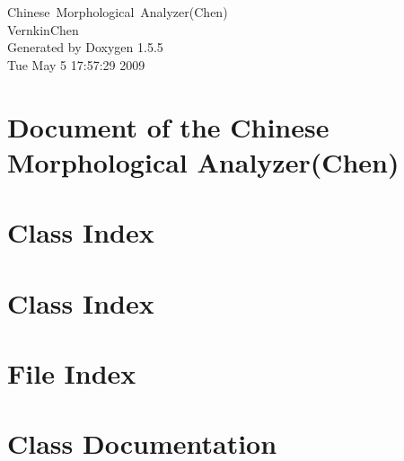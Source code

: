 \documentclass[a4paper]{book}
\begin{document}
\begin{titlepage}
\vspace*{7cm}
\begin{center}
{\Large Chinese~Morphological~Analyzer(Chen) \\[1ex]\large VernkinChen }\\
\vspace*{1cm}
{\large Generated by Doxygen 1.5.5}\\
\vspace*{0.5cm}
{\small Tue May 5 17:57:29 2009}\\
\end{center}
\end{titlepage}
\clearemptydoublepage
{}
\tableofcontents
\clearemptydoublepage
{}
\chapter{Document of the Chinese Morphological Analyzer(Chen) }
\label{index}
\chapter{Class Index}

\chapter{Class Index}

\chapter{File Index}

\chapter{Class Documentation}






























\end{document}
